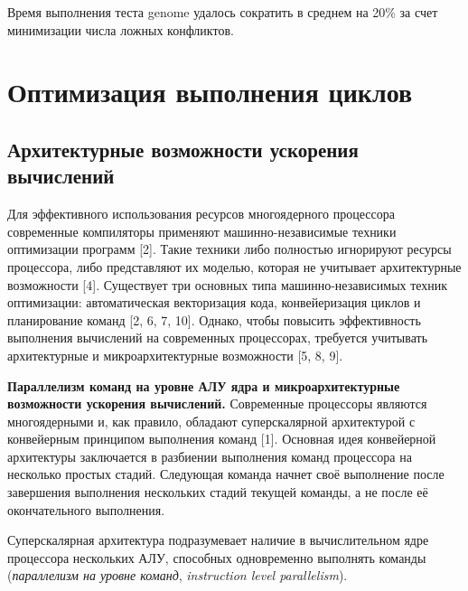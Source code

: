 Время выполнения теста genome удалось сократить в среднем на 20\% за счет 
минимизации числа ложных конфликтов.

\section{Оптимизация выполнения циклов}
\subsection{Архитектурные возможности ускорения вычислений}
Для эффективного использования ресурсов многоядерного процессора современные компиляторы применяют машинно-независимые техники оптимизации программ [2]. Такие техники либо полностью игнорируют ресурсы процессора, либо представляют их моделью, которая не учитывает архитектурные возможности [4]. Существует три основных типа машинно-независимых техник оптимизации: автоматическая векторизация кода, конвейеризация циклов и планирование команд [2, 6, 7, 10]. Однако, чтобы повысить эффективность выполнения вычислений на современных процессорах, требуется учитывать архитектурные и микроархитектурные возможности [5, 8, 9].

\textbf{Параллелизм команд на уровне АЛУ ядра и микроархитектурные возможности ускорения вычислений.}
Современные процессоры являются многоядерными и, как правило, обладают суперскалярной архитектурой с конвейерным принципом выполнения команд [1]. Основная идея конвейерной архитектуры заключается в разбиении выполнения команд процессора на несколько простых стадий. Следующая команда начнет своё выполнение после завершения выполнения нескольких стадий текущей команды, а не после её окончательного выполнения.

Суперскалярная архитектура подразумевает наличие в вычислительном ядре процессора нескольких АЛУ, способных одновременно выполнять команды (\textit{параллелизм на уровне команд}, \textit{instruction level parallelism}).

